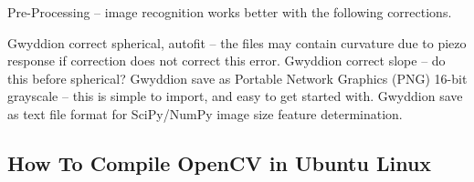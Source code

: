 \documentclass[12pt,oneside,english]{article}
\begin{document}
    Pre-Processing -- image recognition works better with the following corrections.
   
    Gwyddion correct spherical, autofit  -- the files may contain curvature due to piezo response if correction does not correct this error.
    Gwyddion correct slope -- do this before spherical?
    Gwyddion save as Portable Network Graphics (PNG) 16-bit grayscale -- this is simple to import, and easy to get started with.
    Gwyddion save as text file format for SciPy/NumPy image size feature determination.

	\subsection{How To Compile OpenCV in Ubuntu Linux}
	
	
	\clearpage
	
\end{document}
